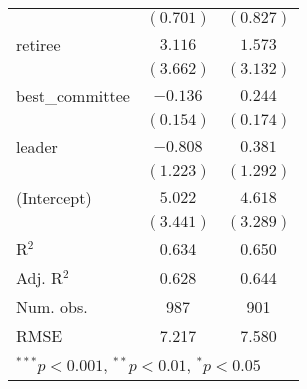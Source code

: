 \documentclass[12pt]{article}
\begin{document}
\begin{table}
\begin{center}
\begin{tabular}{l c c }
			& $(0.701)$      & $(0.827)$      \\
			retiree                  & $3.116$        & $1.573$        \\
			& $(3.662)$      & $(3.132)$      \\
			best\_committee          & $-0.136$       & $0.244$        \\
			& $(0.154)$      & $(0.174)$      \\
			leader                   & $-0.808$       & $0.381$        \\
			& $(1.223)$      & $(1.292)$      \\
			(Intercept)              & $5.022$        & $4.618$        \\
			& $(3.441)$      & $(3.289)$      \\
			\hline
			R$^2$                    & 0.634          & 0.650          \\
			Adj. R$^2$               & 0.628          & 0.644          \\
			Num. obs.                & 987            & 901            \\
			RMSE                     & 7.217          & 7.580          \\
			\hline
			\multicolumn{3}{l}{\scriptsize{$^{***}p<0.001$, $^{**}p<0.01$, $^*p<0.05$}}
		\end{tabular}
	\end{center}
\end{table}
\end{document}
